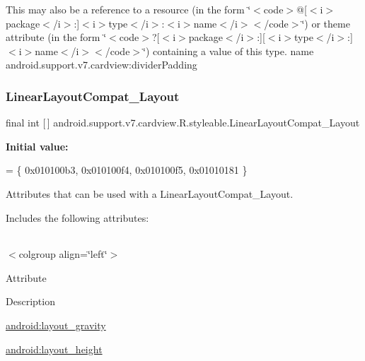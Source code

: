 This may also be a reference to a resource (in the form \char`\"{}$<$code$>$@\mbox{[}$<$i$>$package$<$/i$>$\+:\mbox{]}$<$i$>$type$<$/i$>$\+:$<$i$>$name$<$/i$>$$<$/code$>$\char`\"{}) or theme attribute (in the form \char`\"{}$<$code$>$?\mbox{[}$<$i$>$package$<$/i$>$\+:\mbox{]}\mbox{[}$<$i$>$type$<$/i$>$\+:\mbox{]}$<$i$>$name$<$/i$>$$<$/code$>$\char`\"{}) containing a value of this type.  name android.\+support.\+v7.\+cardview\+:divider\+Padding \mbox{\label{classandroid_1_1support_1_1v7_1_1cardview_1_1R_1_1styleable_a7340b53bc5e0f0d0fbff100b36717ee2}} 
\subsubsection{\texorpdfstring{Linear\+Layout\+Compat\+\_\+\+Layout}{LinearLayoutCompat\_Layout}}
{\footnotesize\ttfamily final int \mbox{[}$\,$\mbox{]} android.\+support.\+v7.\+cardview.\+R.\+styleable.\+Linear\+Layout\+Compat\+\_\+\+Layout\hspace{0.3cm}{\ttfamily [static]}}

{\bfseries Initial value\+:}
\begin{DoxyCode}
= \{
            0x010100b3, 0x010100f4, 0x010100f5, 0x01010181
        \}
\end{DoxyCode}
Attributes that can be used with a Linear\+Layout\+Compat\+\_\+\+Layout. 

Includes the following attributes\+:

\tabulinesep=1mm
\begin{longtabu} spread 0pt [c]{*{0}{|X[-1]}|}
\hline
\end{longtabu}
$<$colgroup align=\char`\"{}left\char`\"{}$>$ 

Attribute

Description 

{\ttfamily \hyperlink{classandroid_1_1support_1_1v7_1_1cardview_1_1R_1_1styleable_a87d2342b6ef4ee1fad3dff9b4d492976}{android\+:layout\+\_\+gravity}}

{\ttfamily \hyperlink{classandroid_1_1support_1_1v7_1_1cardview_1_1R_1_1styleable_af747baf1f87dcca03c3b8c31979c4045}{android\+:layout\+\_\+height}}

